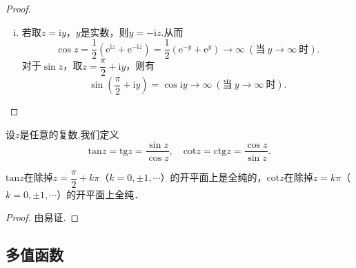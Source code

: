 \documentclass[../../main.tex]{subfiles}
\begin{document}
\begin{proof}
\begin{enumerate}[(i)]
\item 若取$z = \text{i}y$，$y$是实数，则$y=-\text{i}z$.从而
\[
\cos z = \dfrac{1}{2}(\text{e}^{\text{i}z} + \text{e}^{-\text{i}z})
= \dfrac{1}{2}(\text{e}^{-y} + \text{e}^y)
\rightarrow \infty \ (\text{当} \ y \rightarrow \infty \ \text{时}).
\]
对于$\sin z$，取$z = \dfrac{\pi}{2} + \text{i}y$，则有
\[
\sin\left( \dfrac{\pi}{2} + \text{i}y \right) = \cos \text{i}y \rightarrow \infty \ (\text{当} \ y \rightarrow \infty \ \text{时}).
\]
\end{enumerate}

\end{proof}

\begin{definition}
设$z$是任意的复数,我们定义
\[
\text{tan} z=\text{tg} z = \dfrac{\sin z}{\cos z},
\quad 
\text{cot} z=\text{ctg} z = \dfrac{\cos z}{\sin z}.
\]
\end{definition}

\begin{proposition}
$\text{tan} z$在除掉$z = \dfrac{\pi}{2} + k\pi$（$k = 0, \pm 1, \cdots$）的开平面上是全纯的，$\text{cot} z$在除掉$z = k\pi$（$k = 0, \pm 1, \cdots$）的开平面上全纯．
\end{proposition}
\begin{proof}
由易证.

\end{proof}



\subsection{多值函数}
\end{document}
